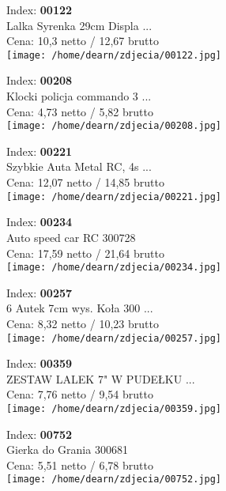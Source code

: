 {Index: \textbf{00122}\\
Lalka Syrenka 29cm Displa ...\\
Cena: 10,3 netto / 12,67 brutto\\
  \texttt{[image: /home/dearn/zdjecia/00122.jpg]}}\newline\newline

{Index: \textbf{00208}\\
Klocki policja commando 3 ...\\
Cena: 4,73 netto / 5,82 brutto\\
  \texttt{[image: /home/dearn/zdjecia/00208.jpg]}}\newline\newline

{Index: \textbf{00221}\\
Szybkie Auta Metal RC, 4s ...\\
Cena: 12,07 netto / 14,85 brutto\\
  \texttt{[image: /home/dearn/zdjecia/00221.jpg]}}\newline\newline

{Index: \textbf{00234}\\
Auto speed car RC 300728\\
Cena: 17,59 netto / 21,64 brutto\\
  \texttt{[image: /home/dearn/zdjecia/00234.jpg]}}\newline\newline

{Index: \textbf{00257}\\
6 Autek 7cm wys. Koła 300 ...\\
Cena: 8,32 netto / 10,23 brutto\\
  \texttt{[image: /home/dearn/zdjecia/00257.jpg]}}\newline\newline

{Index: \textbf{00359}\\
ZESTAW LALEK 7" W PUDEŁKU ...\\
Cena: 7,76 netto / 9,54 brutto\\
  \texttt{[image: /home/dearn/zdjecia/00359.jpg]}}\newline\newline

{Index: \textbf{00752}\\
Gierka do Grania 300681\\
Cena: 5,51 netto / 6,78 brutto\\
  \texttt{[image: /home/dearn/zdjecia/00752.jpg]}}\newline\newline

